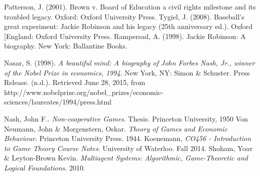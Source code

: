 \documentclass[12pt]{article}
\begin{document}
\begin{thebibliography}{10}
 Patterson, J. (2001). Brown v. Board of Education a civil rights milestone and its troubled legacy. Oxford: Oxford University Press.
 Tygiel, J. (2008). Baseball's great experiment: Jackie Robinson and his legacy (25th anniversary ed.). Oxford [England: Oxford University Press.
 Rampersad, A. (1998). Jackie Robinson: A biography. New York: Ballantine Books.

 Nasar, S. (1998). \textit{A beautiful mind: A biography of John Forbes Nash, Jr., winner of the Nobel Prize in economics, 1994}. New York, NY: Simon \& Schuster.
 Press Release. (n.d.). Retrieved June 28, 2015, from {http://www.nobelprize.org/nobel\_prizes/economic-sciences/laureates/1994/press.html}


 Nash, John F.. \textit{Non-cooperative Games}.  Thesis.  Princeton University, 1950
 Von Neumann, John \& Morgenstern, Oskar. \textit{Theory of Games and Economic Behaviour}. Princeton University Press. 1944.
 Koenemann, \textit{CO456 - Introduction to Game Theory Course Notes}. University of Waterloo. Fall 2014.
 Shoham, Yoav \& Leyton-Brown Kevin. \textit{Multiagent Systems: Algorithmic, Game-Theoretic and Logical Foundations}. 2010.

\end{thebibliography}
\end{document}
